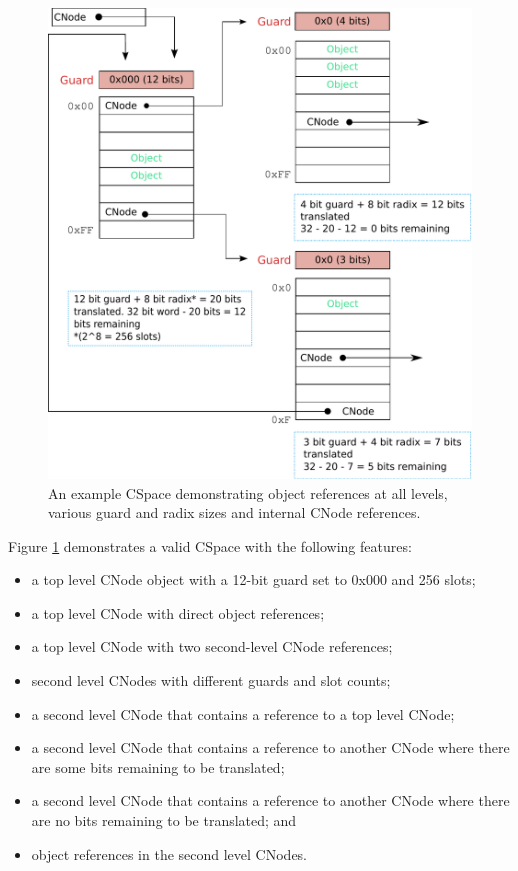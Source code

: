 \begin{figure}[tb]
    \begin{center}
        \includegraphics[scale=0.5]{figs/fig1-4.pdf}
        \caption{An example CSpace demonstrating object references at
          all levels, various guard and radix sizes and internal CNode
          references.}
        \label{fig1.4}
    \end{center}
\end{figure}

Figure \ref{fig1.4} demonstrates a valid CSpace with the following
features:
\begin{itemize}
\item a top level CNode object with a 12-bit guard set to 0x000 and
  256 slots;
\item a top level CNode with direct object references;
\item a top level CNode with two second-level CNode references;
\item second level CNodes with different guards and slot counts;
\item a second level CNode that contains a reference to a top level
  CNode;
\item a second level CNode that contains a reference to another CNode
  where there are some bits remaining to be translated;
\item a second level CNode that contains a reference to another CNode
  where there are no bits remaining to be translated; and
\item object references in the second level CNodes.
\end{itemize}

